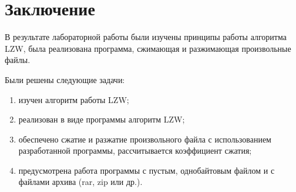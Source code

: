 \chapter*{Заключение}

В результате лабораторной работы были изучены принципы работы алгоритма LZW, была реализована программа, сжимающая и разжимающая произвольные файлы. 

Были решены следующие задачи:

\begin{enumerate}[label=\arabic*)]
    \item изучен алгоритм работы LZW;
    \item реализован в виде программы алгоритм LZW;
    \item обеспечено сжатие и разжатие произвольного файла с использованием разработанной программы, рассчитывается коэффициент сжатия;
    \item предусмотрена работа программы с пустым, однобайтовым файлом и с файлами архива (rar, zip или др.).
\end{enumerate}